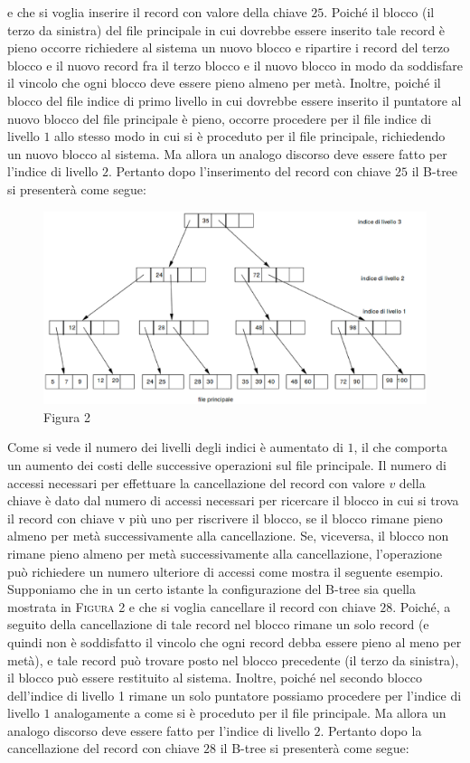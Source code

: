 e che si voglia inserire il record con valore della chiave $25$. Poiché il blocco (il terzo da sinistra) del
file principale in cui dovrebbe essere inserito tale record è pieno occorre richiedere al sistema un
nuovo blocco e ripartire i record del terzo blocco e il nuovo record fra il terzo blocco e il nuovo
blocco in modo da soddisfare il vincolo che ogni blocco deve essere pieno almeno per metà. Inoltre,
poiché il blocco del file indice di primo livello in cui dovrebbe essere inserito il puntatore al nuovo
blocco del file principale è pieno, occorre procedere per il file indice di livello $1$ allo stesso modo in
cui si è proceduto per il file principale, richiedendo un nuovo blocco al sistema. Ma allora un
analogo discorso deve essere fatto per l'indice di livello $2$. Pertanto dopo l'inserimento del record
con chiave $25$ il B-tree si presenterà come segue:

\begin{figure}[h!]
  \centering
  \includegraphics[width=430px]{immagini-eps/img_5_3_4(2).eps}
  Figura 2
\end{figure}

Come si vede il numero dei livelli degli indici è aumentato di $1$, il che comporta un aumento dei
costi delle successive operazioni sul file principale.
Il numero di accessi necessari per effettuare la cancellazione del record con valore $v$ della chiave è
dato dal numero di accessi necessari per ricercare il blocco in cui si trova il record con chiave v più
uno per riscrivere il blocco, se il blocco rimane pieno almeno per metà successivamente alla
cancellazione. Se, viceversa, il blocco non rimane pieno almeno per metà successivamente alla
cancellazione, l'operazione può richiedere un numero ulteriore di accessi come mostra il seguente
esempio.\\
Supponiamo che in un certo istante la configurazione del B-tree sia quella mostrata in \textsc{Figura 2} e che si
voglia cancellare il record con chiave $28$. Poiché, a seguito della cancellazione di tale record nel
blocco rimane un solo record (e quindi non è soddisfatto il vincolo che ogni record debba essere
pieno al meno per metà), e tale record può trovare posto nel blocco precedente (il terzo da sinistra),
il blocco può essere restituito al sistema. Inoltre, poiché nel secondo blocco dell'indice di livello 1
rimane un solo puntatore possiamo procedere per l'indice di livello $1$ analogamente a come si è
proceduto per il file principale. Ma allora un analogo discorso deve essere fatto per l'indice di
livello $2$. Pertanto dopo la cancellazione del record con chiave $28$ il B-tree si presenterà come segue:

